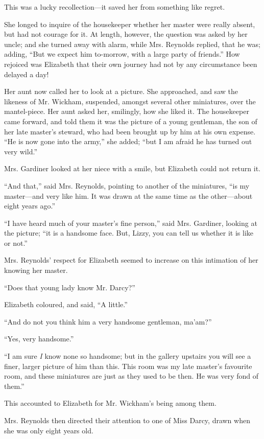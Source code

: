 This was a lucky recollection---it saved her from something like regret.

She longed to inquire of the housekeeper whether her master were really absent, but had not courage for it. At length, however, the question was asked by her uncle; and she turned away with alarm, while Mrs. Reynolds replied, that he was; adding, ``But we expect him to-morrow, with a large party of friends.'' How rejoiced was Elizabeth that their own journey had not by any circumstance been delayed a day!

Her aunt now called her to look at a picture. She approached, and saw the likeness of Mr. Wickham, suspended, amongst several other miniatures, over the mantel-piece. Her aunt asked her, smilingly, how she liked it. The housekeeper came forward, and told them it was the picture of a young gentleman, the son of her late master's steward, who had been brought up by him at his own expense. ``He is now gone into the army,'' she added; ``but I am afraid he has turned out very wild.''

Mrs. Gardiner looked at her niece with a smile, but Elizabeth could not return it.

``And that,'' said Mrs. Reynolds, pointing to another of the miniatures, ``is my master---and very like him. It was drawn at the same time as the other---about eight years ago.''

``I have heard much of your master's fine person,'' said Mrs. Gardiner, looking at the picture; ``it is a handsome face. But, Lizzy, you can tell us whether it is like or not.''

Mrs. Reynolds' respect for Elizabeth seemed to increase on this intimation of her knowing her master.

``Does that young lady know Mr. Darcy?''

Elizabeth coloured, and said, ``A little.''

``And do not you think him a very handsome gentleman, ma'am?''

``Yes, very handsome.''

``I am sure \textit{I} know none so handsome; but in the gallery upstairs you will see a finer, larger picture of him than this. This room was my late master's favourite room, and these miniatures are just as they used to be then. He was very fond of them.''

This accounted to Elizabeth for Mr. Wickham's being among them.

Mrs. Reynolds then directed their attention to one of Miss Darcy, drawn when she was only eight years old.

